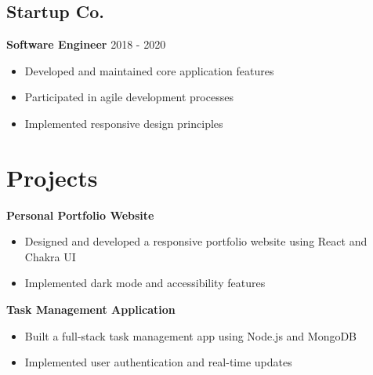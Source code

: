 \documentclass[11pt,a4paper]{article}
\begin{document}
\subsection*{Startup Co.}
\textbf{Software Engineer} \hfill \textcolor{text}{2018 - 2020}
\begin{itemize}[leftmargin=*]
    \item Developed and maintained core application features
    \item Participated in agile development processes
    \item Implemented responsive design principles
\end{itemize}

\section{Projects}
\textbf{Personal Portfolio Website}
\begin{itemize}[leftmargin=*]
    \item Designed and developed a responsive portfolio website using React and Chakra UI
    \item Implemented dark mode and accessibility features
\end{itemize}

\textbf{Task Management Application}
\begin{itemize}[leftmargin=*]
    \item Built a full-stack task management app using Node.js and MongoDB
    \item Implemented user authentication and real-time updates
\end{itemize}
\end{document}
